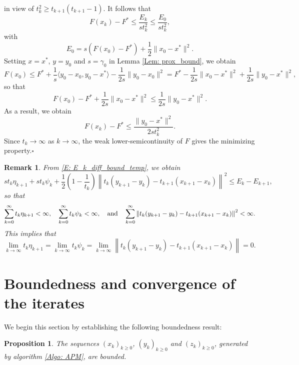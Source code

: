 \documentclass[pdflatex,sn-mathphys-num]{sn-jnl}
\theoremstyle{thmstyleone}
\newtheorem{proposition}[theorem]{Proposition}
\theoremstyle{thmstyletwo}
\newtheorem{remark}{Remark}
\theoremstyle{thmstylethree}
\newcommand{\qbox}[1]{\quad\hbox{#1}\quad}
\newcommand{\wbx}{\hfill$\square$}
\begin{document}
in view of $t_k^2 \ge t_{k+1}(t_{k+1}-1)$. It follows that
$$ F(x_k) - F^* \le \frac{E_k}{st_k^2} \le \frac{E_0}{st_k^2}, $$
with
$$ E_0 = s\left( F(x_0) - F^* \right) + \frac{1}{2}\| x_0 - x^* \|^2. $$
Setting $x=x^*$, $y=y_0$ and $s=\gamma_0$ in Lemma \ref{Lem: prox_bound}, we obtain
$$F(x_0) 
\le F^* + \frac{1}{s}\langle y_0-x_0, y_0-x^* \rangle - \frac{1}{2s}\| y_0-x_0 \|^2 
= F^* - \frac{1}{2s}\| x_0 - x^* \|^2 + \frac{1}{2s}\| y_0-x^* \|^2,$$
so that 
$$ F(x_0) - F^* + \frac{1}{2s}\| x_0-x^* \|^2 \le \frac{1}{2s}\| y_0-x^* \|^2.  $$
As a result, we obtain
$$ F(x_k) - F^* \le \frac{\| y_0-x^* \|^2}{2st_k^2}. $$
Since $t_k\to\infty$ as $k\to\infty$, the weak lower-semicontinuity of $F$ gives the minimizing property.\wbx


\begin{remark}\label{Rem: sequence_sum_limit}
From \eqref{E: E_k_diff_bound_temp}, we obtain
$$ st_k\eta_{k+1} + st_k\psi_k + \frac{1}{2}\left( 1 - \frac{1}{t_k} \right) \left\| t_k(y_{k+1}-y_k) - t_{k+1}(x_{k+1}-x_k) \right\|^2 \le E_k - E_{k+1}, $$
so that
$$ \sum_{k=0}^\infty t_k \eta_{k+1} < \infty,\quad \sum_{k=0}^\infty t_k\psi_k < \infty,\qbox{and} \sum_{k=0}^\infty \left\| t_k(y_{k+1}-y_k) - t_{k+1}(x_{k+1}-x_k) \right\|^2 < \infty. $$
This implies that
$$ \lim_{k\to\infty} t_k \eta_{k+1} 
= \lim_{k\to\infty} t_k\psi_k
= \lim_{k\to\infty} \left\| t_k(y_{k+1}-y_k) - t_{k+1}(x_{k+1}-x_k) \right\| = 0.$$
\end{remark}




\section{Boundedness and convergence of the iterates} \label{Sec: iterates}
We begin this section by establishing the following boundedness result:

\begin{proposition}\label{Prop: bounded_sequence}
The sequences $(x_k)_{k\ge 0}$, $(y_k)_{k\ge 0}$ and $(z_k)_{k\ge 0}$, generated by algorithm \eqref{Algo: APM}, are bounded. 
\end{proposition}
\end{document}
